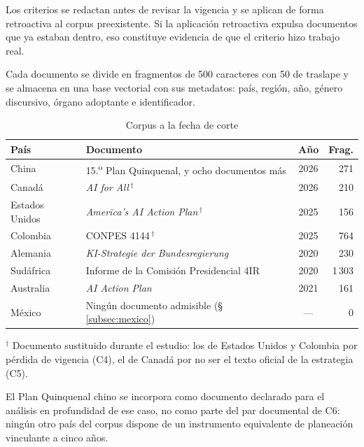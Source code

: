 \documentclass[12pt,letterpaper]{article}
\newcommand{\zhg}[1]{}
\begin{document}
Los criterios se redactan antes de revisar la vigencia y se aplican de forma retroactiva al corpus preexistente. Si la aplicación retroactiva expulsa documentos que ya estaban dentro, eso constituye evidencia de que el criterio hizo trabajo real.

Cada documento se divide en fragmentos de 500 caracteres con 50 de traslape y se almacena en una base vectorial con sus metadatos: país, región, año, género discursivo, órgano adoptante e identificador.

\begin{table}[htbp]
\centering
\small
\caption{Corpus a la fecha de corte}
\begin{tabular}{@{}llcr@{}}
\toprule
\textbf{País} & \textbf{Documento} & \textbf{Año} & \textbf{Frag.} \\
\midrule
China          & 15.\textsuperscript{o} Plan Quinquenal\zhg{十五五}, y ocho documentos más & 2026 & 271 \\
Canadá         & \textit{AI for All}\,$^{\dagger}$                        & 2026 & 210 \\
Estados Unidos & \textit{America's AI Action Plan}\,$^{\dagger}$          & 2025 & 156 \\
Colombia       & CONPES 4144\,$^{\dagger}$                                & 2025 & 764 \\
Alemania       & \textit{KI-Strategie der Bundesregierung}                & 2020 & 230 \\
Sudáfrica      & Informe de la Comisión Presidencial 4IR                  & 2020 & 1\,303 \\
Australia      & \textit{AI Action Plan}                                  & 2021 & 161 \\
\midrule
México         & Ningún documento admisible (§\,\ref{subsec:mexico})      & ---  & 0 \\
\bottomrule
\end{tabular}
\vspace{0.3em}
{\footnotesize\par\noindent$^{\dagger}$ Documento sustituido durante el estudio: los de Estados Unidos y Colombia por pérdida de vigencia (C4), el de Canadá por no ser el texto oficial de la estrategia (C5).}
\end{table}

El Plan Quinquenal chino se incorpora como documento declarado para el análisis en profundidad de ese caso, no como parte del par documental de C6: ningún otro país del corpus dispone de un instrumento equivalente de planeación vinculante a cinco años.
\end{document}
